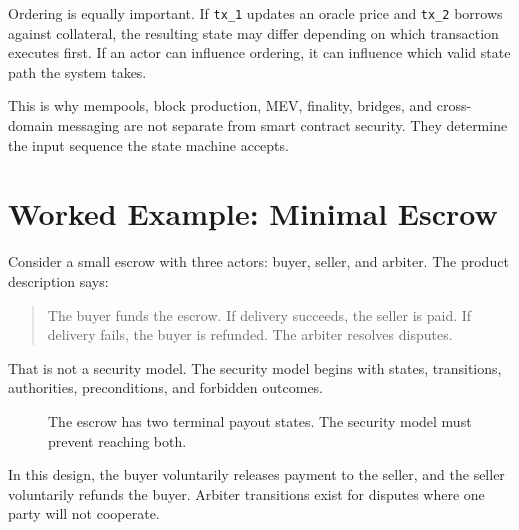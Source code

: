 Ordering is equally important. If \texttt{tx\_1} updates an oracle price and \texttt{tx\_2} borrows against collateral, the resulting state may differ depending on which transaction executes first. If an actor can influence ordering, it can influence which valid state path the system takes.

This is why mempools, block production, MEV, finality, bridges, and cross-domain messaging are not separate from smart contract security. They determine the input sequence the state machine accepts.

\section{Worked Example: Minimal Escrow}

Consider a small escrow with three actors: buyer, seller, and arbiter. The product description says:

\begin{quote}
The buyer funds the escrow. If delivery succeeds, the seller is paid. If delivery fails, the buyer is refunded. The arbiter resolves disputes.
\end{quote}

That is not a security model. The security model begins with states, transitions, authorities, preconditions, and forbidden outcomes.

\begin{figure}[htbp]
\centering
{}
\caption{The escrow has two terminal payout states. The security model must prevent reaching both.}
\end{figure}

In this design, the buyer voluntarily releases payment to the seller, and the seller voluntarily refunds the buyer. Arbiter transitions exist for disputes where one party will not cooperate.

